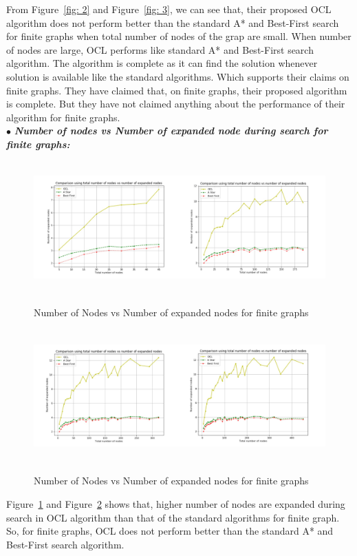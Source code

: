 \documentclass[12pt]{article}
\begin{document}
From Figure~\ref{fig: 2} and Figure~\ref{fig: 3}, we can see that, their proposed OCL algorithm does not perform better than the standard A* and Best-First search for finite graphs when total number of nodes of the grap are small. When number of nodes are large, OCL performs like standard A* and Best-First search algorithm. The algorithm is complete as it can find the solution whenever solution is available like the standard algorithms. Which supports their claims on finite graphs. They have claimed that, on finite graphs, their proposed algorithm is complete. But they have not claimed anything about the performance of their algorithm for finite graphs.\\

\hspace*{0.5cm}$\bullet$ \textit{\textbf{Number of nodes vs Number of expanded node during search for finite graphs:}}
\begin{figure}[ht]
		{\includegraphics[width=\textwidth,height=2in]{3.jpeg}}
		\caption{Number of Nodes vs Number of expanded nodes for finite graphs}
        \label{fig: 4}
\end{figure}

\newpage

\begin{figure}[ht]
		{\includegraphics[width=\textwidth,height=2in]{4.jpeg}}
		\caption{Number of Nodes vs Number of expanded nodes for finite graphs}
        \label{fig: 5}
\end{figure}

Figure~\ref{fig: 4} and Figure~\ref{fig: 5} shows that, higher number of nodes are expanded during search in OCL algorithm than that of the standard algorithms for finite graph. So, for finite graphs, OCL does not perform better than the standard A* and Best-First search algorithm.\\
\end{document}
